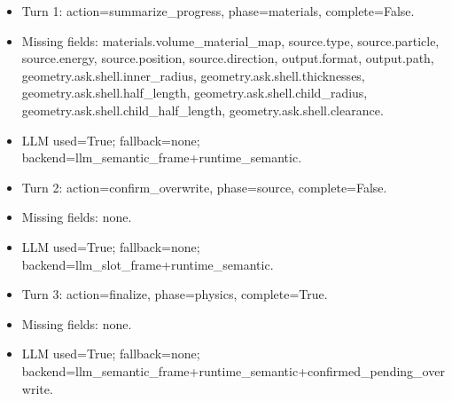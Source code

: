 \documentclass[11pt]{ctexart}
\begin{document}
\begin{itemize}
\item Turn 1: action=summarize\_progress, phase=materials, complete=False.
\item Missing fields: materials.volume\_material\_map, source.type, source.particle, source.energy, source.position, source.direction, output.format, output.path, geometry.ask.shell.inner\_radius, geometry.ask.shell.thicknesses, geometry.ask.shell.half\_length, geometry.ask.shell.child\_radius, geometry.ask.shell.child\_half\_length, geometry.ask.shell.clearance.
\item LLM used=True; fallback=none; backend=llm\_semantic\_frame+runtime\_semantic.
\item Turn 2: action=confirm\_overwrite, phase=source, complete=False.
\item Missing fields: none.
\item LLM used=True; fallback=none; backend=llm\_slot\_frame+runtime\_semantic.
\item Turn 3: action=finalize, phase=physics, complete=True.
\item Missing fields: none.
\item LLM used=True; fallback=none; backend=llm\_semantic\_frame+runtime\_semantic+confirmed\_pending\_overwrite.
\end{itemize}
\end{document}
